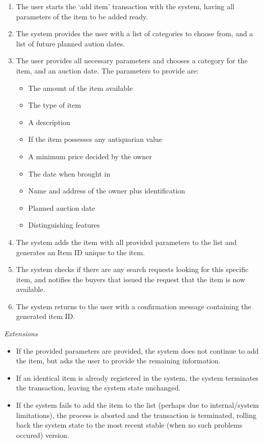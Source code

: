 \begin{enumerate}[noitemsep]
	\item The user starts the `add item' transaction with the system, having all parameters of the item to be added ready.
	\item The system provides the user with a list of categories to choose from, and a list of future planned aution dates.
	\item The user provides all necessary parameters and chooses a category for the item, and an auction date. The parameters to provide are:
	\begin{itemize}[noitemsep]
		\item The amount of the item available
		\item The type of item
		\item A description
		\item If the item possesses any antiquarian value
		\item A minimum price decided by the owner
		\item The date when brought in
		\item Name and address of the owner plus identification
		\item Planned auction date
		\item Distinguishing features
	\end{itemize}
	\item The system adds the item with all provided parameters to the list and generates an Item ID unique to the item.
	\item The system checks if there are any search requests looking for this specific item, and notifies the buyers that issued the request that the item is now available.
	\item The system returns to the user with a confirmation message containing the generated item ID.
\end{enumerate}
\textsl{Extensions}
\begin{itemize}[noitemsep]
	\item If the provided parameters are provided, the system does not continue to add the item, but asks the user to provide the remaining information.
	\item If an identical item is already registered in the system, the system terminates the transaction, leaving the system state unchanged.
	\item If the system fails to add the item to the list (perhaps due to internal/system limitations), the process is aborted and the transaction is terminated, rolling back the system state to the most recent stable (when no such problems occured) version.
\end{itemize}
